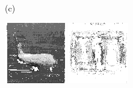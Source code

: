 \documentclass{article}
\begin{document}
\begin{figure}[t]
\begin{minipage}[c]{.21\linewidth}
  \end{minipage}
  \begin{minipage}[c]{.1\linewidth}
    \centering\centerline{(c)}
  \end{minipage}
  \begin{minipage}[c]{.21\linewidth}
    \centering\centerline{\includegraphics[width=\linewidth]{imgs/gens_cal/airplane/sums/13_1.png}}
  \end{minipage}
  \begin{minipage}[c]{.21\linewidth}
    \centering\centerline{\includegraphics[width=\linewidth]{imgs/gens_cal/dollar/sums/0_1.png}}

\end{minipage}
\end{figure}
\end{document}
